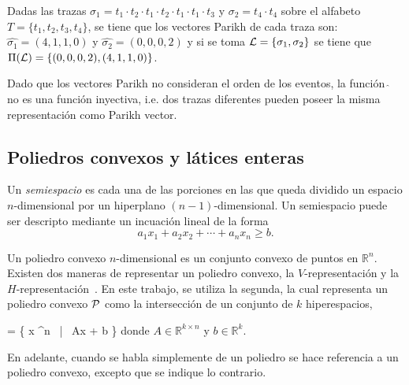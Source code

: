 \begin{example}
    Dadas las trazas  $\sigma_1=t_1 \cdot t_2 \cdot t_1 \cdot t_2 \cdot t_1 \cdot t_1 \cdot t_3$
    y $\sigma_2=t_4 \cdot t_4$ sobre el alfabeto $T=\{t_1,t_2,t_3,t_4\}$,
    se tiene que los vectores Parikh de cada traza son: $\widehat{\sigma_1} = (4,1,1,0)$ y
    $\widehat{\sigma_2} = (0,0,0,2)$ y si se toma \mbox{${\mathcal L} =\{\sigma_1,\sigma_2\}$}
    se tiene que $\Pi({\mathcal L})=\{ (0,0,0,2),(4,1,1,0) \}$.
\end{example}

Dado que los vectores Parikh no consideran el orden de los eventos, la función \mbox{$\widehat{\ }$} no 
es una función inyectiva, i.e. dos trazas diferentes pueden poseer la misma representación como Parikh
vector.

\subsection{Poliedros convexos y látices enteras} 
\label{sec:2.discovery polyhedra}

Un \textit{semiespacio} es cada
una de las porciones en las que queda dividido un espacio $n$-dimensional por un hiperplano $(n-1)$-dimensional. Un semiespacio
puede ser descripto mediante un incuación lineal de la forma $$a_1x_1 + a_2x_2 + \cdots + a_nx_n \geq b.$$

Un poliedro convexo $n$-dimensional es un conjunto convexo de puntos en $\mathbb{R}^n$. Existen 
dos maneras de representar un poliedro convexo, la $V$-representación y la $H$-representación~\cite{Rockafellar70}.
En este trabajo, se utiliza la segunda, la cual representa un poliedro convexo ${\mathcal P}$ 
como la intersección de un conjunto de $k$ hiperespacios,

    \ph = \{ x \in {}^n ~|~ A\cdot x + b \}
\eequation
donde  \mbox{$A \in \mathbb{R}^{k \times n}$} y
\mbox{$b\in\mathbb{R}^{k}$}.

En adelante, cuando se habla simplemente de un poliedro se hace referencia a un poliedro convexo,
excepto que se indique lo contrario.
%
%

